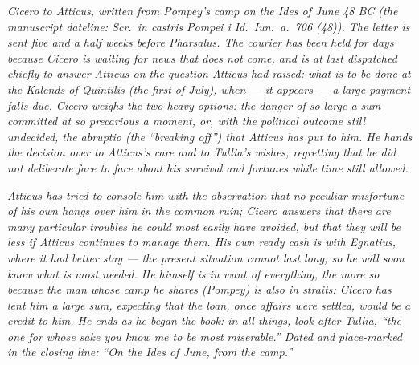 
\textit{Cicero to Atticus, written from Pompey's camp on
the Ides of June 48 BC (the manuscript dateline:
\textit{Scr.\ in castris Pompei i Id.\ Iun.\ a.\ 706 (48)}).
The letter is sent five and a half weeks before
Pharsalus. The courier has been held for days because
Cicero is waiting for news that does not come, and is at
last dispatched chiefly to answer Atticus on the question
Atticus had raised: what is to be done at the Kalends of
Quintilis (the first of July), when --- it appears --- a
large payment falls due. Cicero weighs the two heavy
options: the danger of so large a sum committed at so
precarious a moment, or, with the political outcome still
undecided, the \textit{abruptio} (the ``breaking off'')
that Atticus has put to him. He hands the decision over
to Atticus's care and to Tullia's wishes, regretting
that he did not deliberate face to face about his
survival and fortunes while time still allowed.}

\textit{Atticus has tried to console him with the
observation that no peculiar misfortune of his own hangs
over him in the common ruin; Cicero answers that there
\textit{are} many particular troubles he could most
easily have avoided, but that they will be less if
Atticus continues to manage them. His own ready cash is
with Egnatius, where it had better stay --- the present
situation cannot last long, so he will soon know what is
most needed. He himself is in want of everything, the
more so because the man whose camp he shares (Pompey) is
also in straits: Cicero has lent him a large sum,
expecting that the loan, once affairs were settled, would
be a credit to him. He ends as he began the book: in
all things, look after Tullia, ``the one for whose sake
you know me to be most miserable.'' Dated and place-marked
in the closing line: ``On the Ides of June, from the camp.''}
